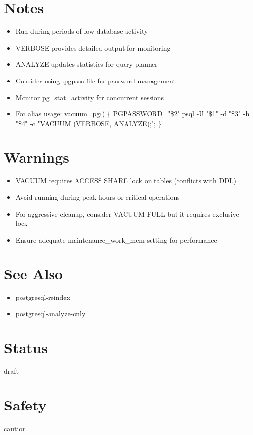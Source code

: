 \documentclass[openany]{book}
\begin{document}
\section*{Notes}
\begin{itemize}
  \item Run during periods of low database activity
  \item VERBOSE provides detailed output for monitoring
  \item ANALYZE updates statistics for query planner
  \item Consider using .pgpass file for password management
  \item Monitor pg\_stat\_activity for concurrent sessions
  \item For alias usage: vacuum\_pg() \{ PGPASSWORD="\$2" psql -U "\$1" -d "\$3" -h "\$4" -c "VACUUM (VERBOSE, ANALYZE);"; \}
\end{itemize}

\section*{Warnings}
\begin{itemize}
  \item VACUUM requires ACCESS SHARE lock on tables (conflicts with DDL)
  \item Avoid running during peak hours or critical operations
  \item For aggressive cleanup, consider VACUUM FULL but it requires exclusive lock
  \item Ensure adequate maintenance\_work\_mem setting for performance
\end{itemize}

\section*{See Also}
\begin{itemize}
  \item postgresql-reindex
  \item postgresql-analyze-only
\end{itemize}

\section*{Status}
draft

\section*{Safety}
caution
\end{document}
